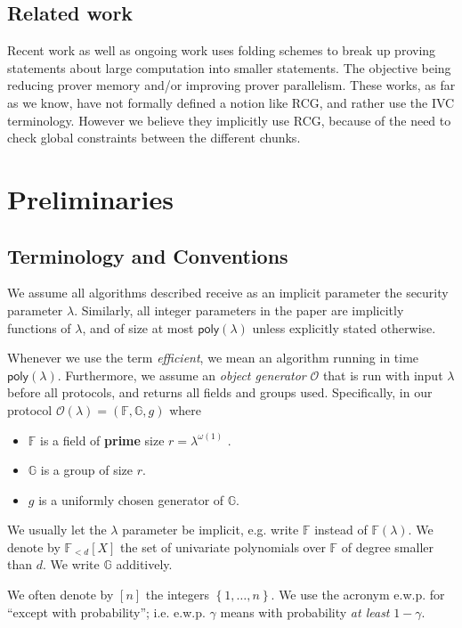 \documentclass[11pt]{article} %
\newcommand{\G}{\ensuremath{{\mathbb G}}\xspace}
\newcommand{\F}{\ensuremath{\mathbb F}\xspace}
\newcommand{\defeq}{:=}
\newcommand{\set}[1]{\ensuremath{\left\{#1\right\}}\xspace}
\newcommand{\polysofdeg}[1]{\ensuremath{\F_{< #1}[X]}\xspace}
\newcommand{\obgen}{\ensuremath{\mathcal O}\xspace}
\newcommand{\poly}{\ensuremath{\mathsf{poly(\lambda)}}\xspace}
\begin{document}
\subsection{Related work}
Recent work  \cite{moonmoon, mangrove} as well as ongoing work \cite{jenstalk} uses folding schemes\cite{nova} to break up proving statements about large computation into smaller statements.
The objective being reducing prover memory and/or improving prover parallelism.
These works, as far as we know, have not formally defined a notion like RCG, and rather use the IVC terminology. However we believe they implicitly use RCG, because of the need to check global constraints between the different chunks.



\section{Preliminaries}
\subsection{Terminology and Conventions}\label{sec:terminology}
We assume all algorithms described receive as an implicit parameter the security parameter $\lambda$.
Similarly, all integer parameters in the paper are implicitly functions of $\lambda$, and of size at most \poly unless explicitly stated otherwise.

Whenever we use the term \emph{efficient}, we mean an algorithm running in time \poly. Furthermore,
we assume an \emph{object generator} \obgen that is run with input $\lambda$ before all protocols, and returns all fields and groups used. Specifically, in our protocol $\obgen(\lambda) = (\F, \G,g)$ where
\begin{itemize}
\item \F is a field of \textbf{prime} size $r = \lambda^{\omega(1)}$
.
\item $\G$ is a group of size $r$.
\item $g$ is a uniformly chosen generator of \G.
\end{itemize}
We usually let the $\lambda$ parameter be implicit, e.g. write \F instead of $\F(\lambda)$.
We denote by \polysofdeg{d} the set of univariate polynomials over \F of degree smaller than $d$. 
We write \G additively.

We often denote by $[n]$ the integers \set{1,\ldots,n}.
We use the acronym e.w.p. for ``except with probability''; i.e. e.w.p. $\gamma$ means with probability \emph{at least} $1-\gamma$.
\end{document}
